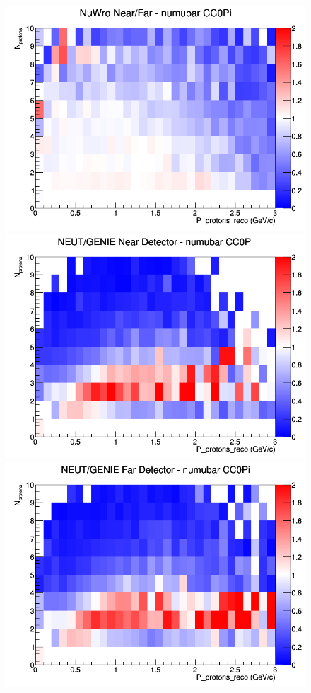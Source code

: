 \begin{figure}[h]
\endminipage
{}
\includegraphics[width=\linewidth]{eff_N_P/LAr/protons/ratios/CC0Pi_NuWro_numubar_NF_N_P.png}
\endminipage
\newline
{}
\includegraphics[width=\linewidth]{eff_N_P/LAr/protons/ratios/CC0Pi_NEUT_GENIE_numubar_near_N_P.png}
\endminipage
{}
\includegraphics[width=\linewidth]{eff_N_P/LAr/protons/ratios/CC0Pi_NEUT_GENIE_numubar_far_N_P.png}

\end{figure}
